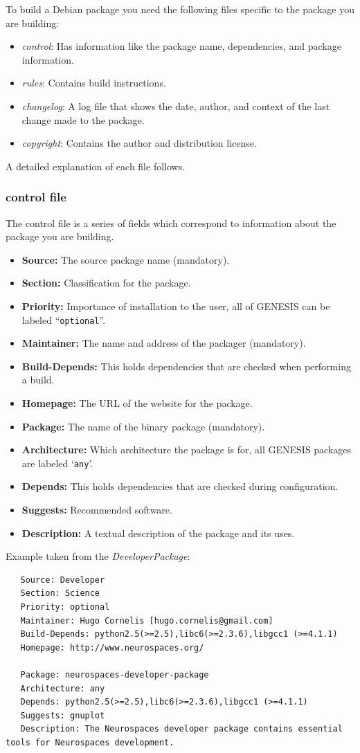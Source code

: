 \documentclass[12pt]{article}
\begin{document}
To build a Debian package you need the following files specific to the package you are building:
\begin{itemize}
\item {\it control}: Has information like the package name, dependencies, and package information.
\item {\it rules}: Contains build instructions.
\item {\it changelog}: A log file that shows the date, author, and context of the last change made to the package.
\item {\it copyright}: Contains the author and distribution license. 
\end{itemize}

A detailed explanation of each file follows.

\subsubsection*{control file}

The control file is a series of fields which correspond to information about the package you are building.
\begin{itemize}
\item {\bf Source:} The source package name ({\color{red}mandatory}).
\item {\bf Section:} Classification for the package.
\item {\bf Priority:} Importance of installation to the user, all of GENESIS can be labeled ``{\tt optional}''.
\item {\bf Maintainer:} The name and address of the packager ({\color{red}mandatory}).
\item {\bf Build-Depends:} This holds dependencies that are checked when performing a build.
\item {\bf Homepage:} The URL of the website for the package.
\item {\bf Package:} The name of the binary package ({\color{red}mandatory}).
\item {\bf Architecture:} Which architecture the package is for, all GENESIS packages are labeled `{\tt any}'.
\item {\bf Depends:} This holds dependencies that are checked during configuration.
\item {\bf Suggests:} Recommended software.
\item {\bf Description:} A textual description of the package and its uses. 
\end{itemize}
Example taken from the {\it DeveloperPackage}:
\begin{verbatim}
   Source: Developer
   Section: Science 
   Priority: optional
   Maintainer: Hugo Cornelis [hugo.cornelis@gmail.com]
   Build-Depends: python2.5(>=2.5),libc6(>=2.3.6),libgcc1 (>=4.1.1)
   Homepage: http://www.neurospaces.org/
   
   Package: neurospaces-developer-package
   Architecture: any
   Depends: python2.5(>=2.5),libc6(>=2.3.6),libgcc1 (>=4.1.1)
   Suggests: gnuplot
   Description: The Neurospaces developer package contains essential tools for Neurospaces development.
\end{verbatim}
\end{document}
